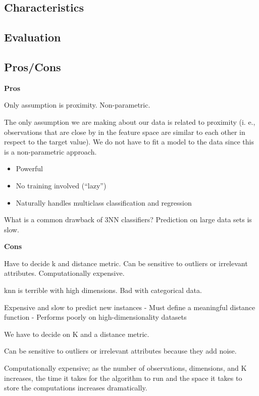 \documentclass[]{book}
\providecommand{\tightlist}{%
  \setlength{\itemsep}{0pt}\setlength{\parskip}{0pt}}
\theoremstyle{definition}
\theoremstyle{definition}
\theoremstyle{definition}
\theoremstyle{remark}
\begin{document}
\subsection{Characteristics}\label{characteristics-3}

\subsection{Evaluation}\label{evaluation-7}

\subsection{Pros/Cons}\label{proscons-8}

\textbf{Pros}

Only assumption is proximity. Non-parametric.

The only assumption we are making about our data is related to proximity
(i. e., observations that are close by in the feature space are similar
to each other in respect to the target value). We do not have to fit a
model to the data since this is a non-parametric approach.

\begin{itemize}
\tightlist
\item
  Powerful
\item
  No training involved (``lazy'')
\item
  Naturally handles multiclass classification and regression
\end{itemize}

What is a common drawback of 3NN classifiers? Prediction on large data
sets is slow.

\textbf{Cons}

Have to decide k and distance metric. Can be sensitive to outliers or
irrelevant attributes. Computationally expensive.

knn is terrible with high dimensions. Bad with categorical data.

Expensive and slow to predict new instances - Must define a meaningful
distance function - Performs poorly on high-dimensionality datasets

We have to decide on K and a distance metric.

Can be sensitive to outliers or irrelevant attributes because they add
noise.

Computationally expensive; as the number of observations, dimensions,
and K increases, the time it takes for the algorithm to run and the
space it takes to store the computations increases dramatically.
\end{document}
